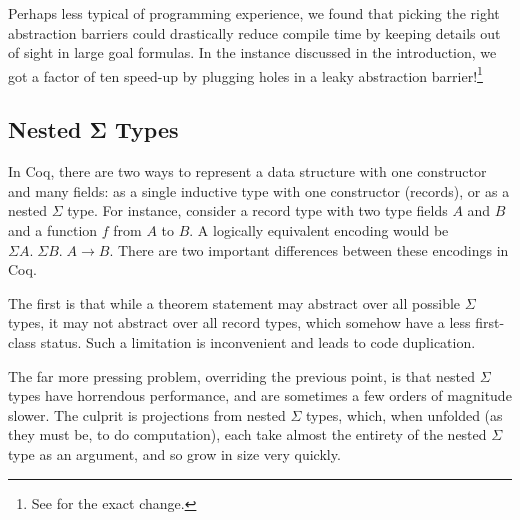 Perhaps less typical of programming experience, we found that picking the right abstraction barriers could drastically reduce compile time by keeping details out of sight in large goal formulas.
In the instance discussed in the introduction, we got a factor of ten speed-up by plugging holes in a leaky abstraction barrier!\footnote{See  for the exact change.}

\subsection{Nested Σ Types} \label{sec:nested-sigma-types}
  In Coq, there are two ways to represent a data structure with one constructor and many fields:
  as a single inductive type with one constructor (records), or as a nested $\Sigma$ type.
  For instance, consider a record type with two type fields $A$ and $B$ and a function $f$ from $A$ to $B$.
  A logically equivalent encoding would be $\Sigma A. \; \Sigma B. \; A \to B$.
  There are two important differences between these encodings in Coq.

  \label{sec:prim-record-proj}
  The first is that while a theorem statement may abstract over all possible $\Sigma$ types, it may not abstract over all record types, which somehow have a less first-class status.
  Such a limitation is inconvenient and leads to code duplication.

  The far more pressing problem, overriding the previous point, is that nested $\Sigma$ types have horrendous performance, and are sometimes a few orders of magnitude slower.
  The culprit is projections from nested $\Sigma$ types, which, when unfolded (as they must be, to do computation), each take almost the entirety of the nested $\Sigma$ type as an argument, and so grow in size very quickly.

